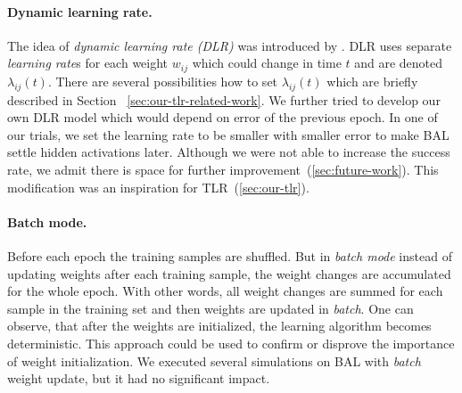 \paragraph{Dynamic learning rate.} 
\label{sec:our-dynamic-lambda} 
The idea of \emph{dynamic learning rate (DLR)} was introduced by \citet{jacobs1988increased}. DLR uses separate \emph{learning rate}s for each weight $w_{ij}$ which could change in time $t$ and are denoted $\lambda_{ij}(t)$. There are several possibilities how to set $\lambda_{ij}(t)$ which are briefly described in Section ~\ref{sec:our-tlr-related-work}. We further tried to develop our own DLR model which would depend on error of the previous epoch. In one of our trials, we set the learning rate to be smaller with smaller error to make BAL settle hidden activations later. Although we were not able to increase the success rate, we admit there is space for further improvement~(\ref{sec:future-work}). This modification was an inspiration for TLR~(\ref{sec:our-tlr}). 

\paragraph{Batch mode.} 
\label{sec:our-batch-mode}
Before each epoch the training samples are shuffled. But in \emph{batch mode} instead of updating weights after each training sample, the weight changes are accumulated for the whole epoch. With other words, all weight changes are summed for each sample in the training set and then weights are updated in \emph{batch}. One can observe, that after the weights are initialized, the learning algorithm becomes deterministic. This approach could be used to confirm or disprove the importance of weight initialization. We executed several simulations on BAL with \emph{batch} weight update, but it had no significant impact. 



